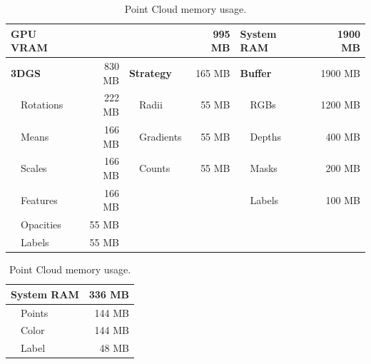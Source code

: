 \begin{table}[h]
	\centering
	\small
	\begin{minipage}[t]{0.68\linewidth}
		\centering
		\caption{3DGS memory usage.}
		\label{tab:memory_usage_3dgs}
		\centering
		\begin{tabular}[t]{|lrlr|lr|}
			\hline
			\textbf{GPU VRAM} &        &                   & 995 MB & \textbf{System RAM} & 1900 MB \\
			\hline\hline
			\textbf{3DGS}     & 830 MB & \textbf{Strategy} & 165 MB & \textbf{Buffer}     & 1900 MB \\
			~~Rotations       & 222 MB & ~~Radii           & 55 MB  & ~~RGBs              & 1200 MB \\
			~~Means           & 166 MB & ~~Gradients       & 55 MB  & ~~Depths            & 400 MB  \\
			~~Scales          & 166 MB & ~~Counts          & 55 MB  & ~~Masks             & 200 MB  \\
			~~Features        & 166 MB &                   &        & ~~Labels            & 100 MB  \\
			~~Opacities       & 55 MB  &                   &        &                     &         \\
			~~Labels          & 55 MB  &                   &        &                     &         \\
			\hline
		\end{tabular}
	\end{minipage}%
	\begin{minipage}[t]{0.3\linewidth}
		\centering
		\caption{Point Cloud memory usage.}
		\label{tab:memory_usage_point_cloud}
		\begin{tabular}[t]{|lr|}
			\hline
			\textbf{System RAM} & 336 MB \\\hline\hline
			~~Points            & 144 MB \\
			~~Color             & 144 MB \\
			~~Label             & 48 MB  \\\hline
		\end{tabular}
	\end{minipage}
\end{table}



